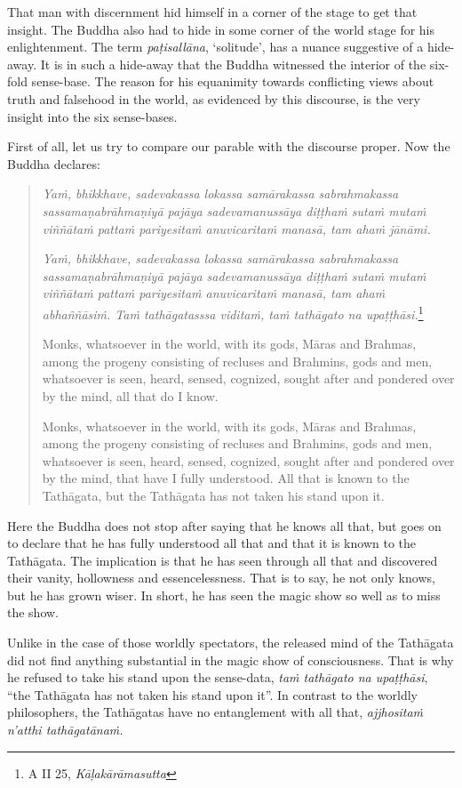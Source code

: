 That man with discernment hid himself in a corner of the stage to get that insight. The Buddha also had to hide in some corner of the world stage for his enlightenment. The term \emph{paṭisallāna}, `solitude', has a nuance suggestive of a hide-away. It is in such a hide-away that the Buddha witnessed the interior of the six-fold sense-base. The reason for his equanimity towards conflicting views about truth and falsehood in the world, as evidenced by this discourse, is the very insight into the six sense-bases.

First of all, let us try to compare our parable with the discourse proper. Now the Buddha declares:

\begin{quote}
\emph{Yaṁ, bhikkhave, sadevakassa lokassa samārakassa sabrahmakassa sassamaṇabrāhmaṇiyā pajāya sadevamanussāya diṭṭhaṁ sutaṁ mutaṁ viññātaṁ pattaṁ pariyesitaṁ anuvicaritaṁ manasā, tam ahaṁ jānāmi.}

\emph{Yaṁ, bhikkhave, sadevakassa lokassa samārakassa sabrahmakassa sassamaṇabrāhmaṇiyā pajāya sadevamanussāya diṭṭhaṁ sutaṁ mutaṁ viññātaṁ pattaṁ pariyesitaṁ anuvicaritaṁ manasā, tam ahaṁ abhaññāsiṁ. Taṁ tathāgatasssa viditaṁ, taṁ tathāgato na upaṭṭhāsi.}\footnote{A II 25, \emph{Kāḷakārāmasutta}}

Monks, whatsoever in the world, with its gods, Māras and Brahmas, among the progeny consisting of recluses and Brahmins, gods and men, whatsoever is seen, heard, sensed, cognized, sought after and pondered over by the mind, all that do I know.

Monks, whatsoever in the world, with its gods, Māras and Brahmas, among the progeny consisting of recluses and Brahmins, gods and men, whatsoever is seen, heard, sensed, cognized, sought after and pondered over by the mind, that have I fully understood. All that is known to the Tathāgata, but the Tathāgata has not taken his stand upon it.
\end{quote}

Here the Buddha does not stop after saying that he knows all that, but goes on to declare that he has fully understood all that and that it is known to the Tathāgata. The implication is that he has seen through all that and discovered their vanity, hollowness and essencelessness. That is to say, he not only knows, but he has grown wiser. In short, he has seen the magic show so well as to miss the show.

Unlike in the case of those worldly spectators, the released mind of the Tathāgata did not find anything substantial in the magic show of consciousness. That is why he refused to take his stand upon the sense-data, \emph{taṁ tathāgato na upaṭṭhāsi}, ``the Tathāgata has not taken his stand upon it''. In contrast to the worldly philosophers, the Tathāgatas have no entanglement with all that, \emph{ajjhositaṁ n'atthi tathāgatānaṁ.}

